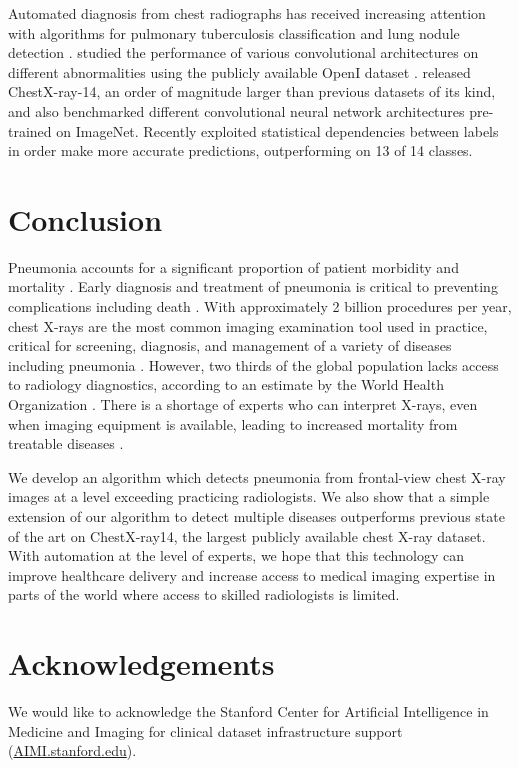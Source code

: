 \documentclass{article}
\begin{document}
Automated diagnosis from chest radiographs has received increasing attention with algorithms  for pulmonary tuberculosis classification \cite{lakhani2017deep2} and lung nodule detection \cite{Huang2017}. \citet{Islam2017} studied the performance of various convolutional architectures on different abnormalities using the publicly available OpenI dataset \citep{demner2015preparing}. \citet{Wang2017} released ChestX-ray-14, an order of magnitude larger than previous datasets of its kind, and also benchmarked different convolutional neural network architectures pre-trained on ImageNet. Recently \citet{Yao2017} exploited statistical dependencies between labels in order make more accurate predictions, outperforming \citet{Wang2017} on 13 of 14 classes.

















%
 \section{Conclusion}
Pneumonia accounts for a significant proportion of patient morbidity and mortality \cite{gonccalves2013community}. Early diagnosis and treatment of pneumonia is critical to preventing complications including death \cite{aydogdu2010mortality}. With approximately 2 billion procedures per year, chest X-rays are the most common imaging examination tool used in practice, critical for screening, diagnosis, and management of a variety of diseases including pneumonia \cite{raoof2012interpretation}. However, two thirds of the global population lacks access to radiology diagnostics, according to an estimate by the World Health Organization \cite{mollura2010white}. There is a shortage of experts who can interpret X-rays, even when imaging equipment is available, leading to increased mortality from treatable diseases \cite{kesselman20162015}.

We develop an algorithm which detects pneumonia from frontal-view chest X-ray images at a level exceeding practicing radiologists. We also show that a simple extension of our algorithm to detect multiple diseases outperforms previous state of the art on ChestX-ray14, the largest publicly available chest X-ray dataset. With automation at the level of experts, we hope that this technology can improve healthcare delivery and increase access to medical imaging expertise in parts of the world where access to skilled radiologists is limited.

%
 
\pagebreak
\section{Acknowledgements}
We would like to acknowledge the Stanford Center for Artificial Intelligence in Medicine and Imaging for clinical dataset infrastructure support (\url{AIMI.stanford.edu}). 



\end{document}
